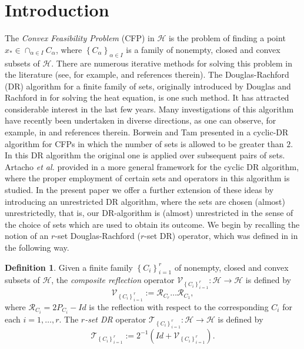 \documentclass[]{interact}
\theoremstyle{plain}%
\theoremstyle{definition}
\newtheorem{definition}[theorem]{Definition}
\theoremstyle{remark}
\begin{document}
\section{\label{sec2}\color{black}Introduction} \color{black}
The \textit{Convex Feasibility Problem} (CFP) in $\mathcal{H}$ is
the problem of finding a point $x_{*}\in\cap_{\alpha\in I}C_{\alpha}$,
where $\left\{ C_{\alpha}\right\} _{\alpha\in I}$ is a family of
nonempty, closed and convex subsets of $\mathcal{H}$. There are numerous
iterative methods for solving this problem in the literature (see,
for example, \cite{key-2,key-4,key-11} and references therein). The
Douglas-Rachford (DR) algorithm for a finite family of sets, originally
introduced by Douglas and Rachford in \cite{key-12} for solving the
heat equation, is one such method. It has attracted considerable
interest in the last few years. Many investigations of this algorithm
have recently been undertaken in diverse directions, as one can observe,
for example, in \cite{bcm19,ies21,key-6,key-13,key-15} and references therein.
Borwein and Tam presented in \cite{key-3} a cyclic-DR algorithm for
CFPs in which the number of sets is allowed to be greater than $2$.
In this DR algorithm the original one is applied over subsequent pairs
of sets. Artacho {\it et al.} provided in \cite{key-19} a more general
framework for the cyclic DR algorithm, where the proper employment
of certain sets and operators in this algorithm is studied. In the
present paper we offer a further extension of these ideas by introducing
an \color{black}unrestricted DR algorithm, where the sets are chosen (almost) unrestrictedly, \color{black}that is, our DR-algorithm is  (almost) unrestricted in the sense of the choice of sets which are used to obtain its outcome. \color{black}
We begin by recalling the notion of an $r$-set Douglas-Rachford ($r$-set
DR) operator, which was defined in \cite{key-15} in the following
way.
\begin{definition}
Given a finite family $\left\{ C_{i}\right\} _{i=1}^{r}$ of nonempty,
closed and convex subsets of $\mathcal{H}$, the \textit{composite
reflection} operator \color{black}$\mathcal{V}_{\left\{ C_{i}\right\} _{i=1}^{r}}:\mathcal{H}\rightarrow\mathcal{H}$ \color{black}
is defined by
\begin{equation}
\mathcal{V}_{\left\{ C_{i}\right\} _{i=1}^{r}}:=\mathcal{R}_{C_{r}}\dots\mathcal{R}_{C_{1}},\label{eq:-6}
\end{equation}
where $\mathcal{R}_{C_{i}}=2P_{C_{i}}-Id$ is the reflection with
respect to the corresponding $C_{i}$ for each $i=1,\dots,r$.
\color{black}The \textit{$r$-set DR }\color{black} operator $\mathcal{T}_{\left\{ C_{i}\right\} _{i=1}^{r}}:\mathcal{H}\rightarrow\mathcal{H}$
is defined by
\begin{equation}
\mathcal{T}_{\left\{ C_{i}\right\} _{i=1}^{r}}:=2^{-1}\left(Id+\mathcal{V}_{\left\{ C_{i}\right\} _{i=1}^{r}}\right).\label{eq:-7}
\end{equation}
\end{definition}
\end{document}
